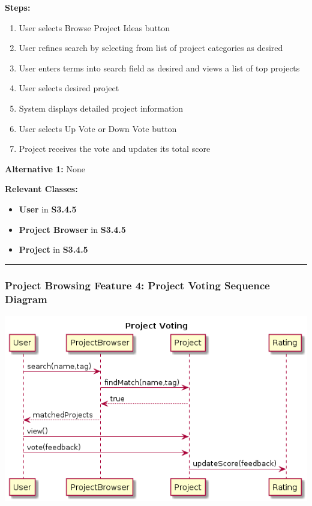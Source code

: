 \documentclass[twoside,letterpaper]{article}
\begin{document}
\noindent\textbf{Steps:} \begin{enumerate}
	\item User selects Browse Project Ideas button
	\item User refines search by selecting from list of project categories as desired
	\item User enters terms into search field as desired and views a list of top projects
	\item User selects desired project
	\item System displays detailed project information
	\item User selects Up Vote or Down Vote button
	\item Project receives the vote and updates its total score
\end{enumerate}
\noindent\textbf{Alternative 1:} None \newline


\noindent\textbf{Relevant Classes:}
\begin{itemize}
	\item \textbf{User} in \textbf{S3.4.5}
	\item \textbf{Project Browser} in \textbf{S3.4.5}
	\item \textbf{Project} in \textbf{S3.4.5}
\end{itemize}
\hrule
\newpage
\subsubsection[Project Browsing Feature 4: Project Voting Sequence Diagram]{\rmfamily\bfseries\color{black}
	Project Browsing Feature 4: Project Voting Sequence Diagram}
\hypertarget{RefHeading22059017292}{}

\bigskip

\includegraphics[width=\textwidth]{images/SequenceDiagrams/ProjectBrowsingProjectVoting}
\end{document}
